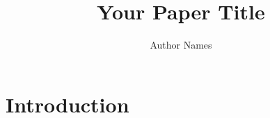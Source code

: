 \documentclass{article}
\title{Your Paper Title}
\author{Author Names}
\begin{document}
\maketitle

\begin{abstract}
\end{abstract}

\section{Introduction}
\label{sec:intro}





\end{document}
